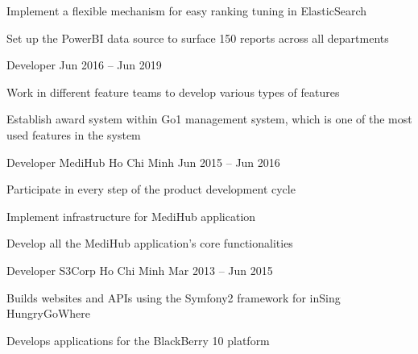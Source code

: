 \documentclass[]{awesome-cv}
\begin{document}
\begin{cventries}
{\begin{cvitems}
		\item {Implement a flexible mechanism for easy ranking tuning in ElasticSearch}
		\item {Set up the PowerBI data source to surface 150 reports across all departments}
		\end{cvitems}}
	\cventry
	{Developer}
	{}
	{}
	{Jun 2016 – Jun 2019}
	{\begin{cvitems}
		\item {Work in different feature teams to develop various types of features}
		\item {Establish award system within Go1 management system, which is one of the most used features in the system}
		\end{cvitems}}
	\cventry
	{Developer}
	{MediHub}
	{Ho Chi Minh}
	{Jun 2015 – Jun 2016}
	{\begin{cvitems}
		\item {Participate in every step of the product development cycle}
		\item {Implement infrastructure for MediHub application}
		\item {Develop all the MediHub application's core functionalities}
		\end{cvitems}}
	\cventry
	{Developer}
	{S3Corp}
	{Ho Chi Minh}
	{Mar 2013 – Jun 2015}
	{
		\begin{cvitems}
			\item {Builds websites and APIs using the Symfony2 framework for inSing HungryGoWhere}
			\item {Develops applications for the BlackBerry 10 platform}
		\end{cvitems}
	}
\end{cventries}
\end{document}
